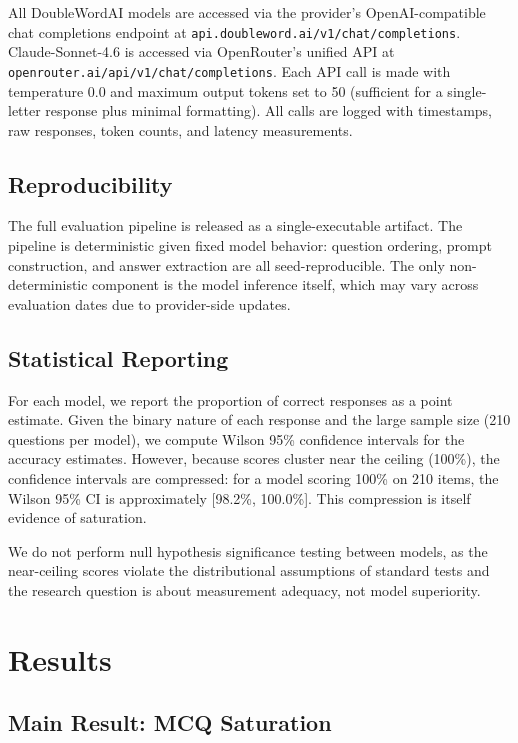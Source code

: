 \documentclass[journal]{IEEEtran}
\begin{document}
All DoubleWordAI models are accessed via the provider's OpenAI-compatible chat completions endpoint at \texttt{api.doubleword.ai/v1/chat/completions}. Claude-Sonnet-4.6 is accessed via OpenRouter's unified API at \texttt{openrouter.ai/api/v1/chat/completions}. Each API call is made with temperature 0.0 and maximum output tokens set to 50 (sufficient for a single-letter response plus minimal formatting). All calls are logged with timestamps, raw responses, token counts, and latency measurements.

\subsection{Reproducibility}

The full evaluation pipeline is released as a single-executable artifact. The pipeline is deterministic given fixed model behavior: question ordering, prompt construction, and answer extraction are all seed-reproducible. The only non-deterministic component is the model inference itself, which may vary across evaluation dates due to provider-side updates.

\subsection{Statistical Reporting}

For each model, we report the proportion of correct responses as a point estimate. Given the binary nature of each response and the large sample size (210 questions per model), we compute Wilson 95\% confidence intervals for the accuracy estimates. However, because scores cluster near the ceiling (100\%), the confidence intervals are compressed: for a model scoring 100\% on 210 items, the Wilson 95\% CI is approximately [98.2\%, 100.0\%]. This compression is itself evidence of saturation.

We do not perform null hypothesis significance testing between models, as the near-ceiling scores violate the distributional assumptions of standard tests and the research question is about measurement adequacy, not model superiority.

\section{Results}

\subsection{Main Result: MCQ Saturation}
\end{document}

